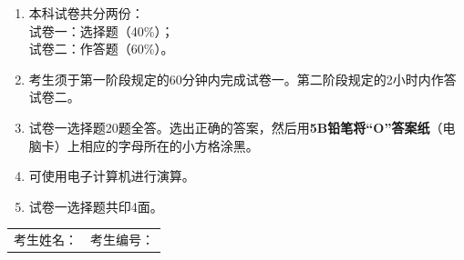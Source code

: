 \begin{enumerate}[label=\arabic*、,leftmargin=2em,itemsep=0.65em]
  \item 本科试卷共分两份：\\
  试卷一：选择题（40\%）；\\
  试卷二：作答题（60\%）。

  \item 考生须于第一阶段规定的60分钟内完成试卷一。第二阶段规定的2小时内作答试卷二。

  \item 试卷一选择题20题全答。选出正确的答案，然后用\textbf{5B铅笔将“O”答案纸}（电脑卡）上相应的字母所在的小方格涂黑。

  \item 可使用电子计算机进行演算。

  \item 试卷一选择题共印4面。
\end{enumerate}

\vspace{2.0em}

\begin{center}
  {\setlength{\fboxrule}{1.2pt}}
\end{center}

\vfill

\begin{tabular*}{\linewidth}{@{\extracolsep{\fill}}ll}
考生姓名：\underline{\hspace{4.2cm}} & 考生编号：\underline{\hspace{4.0cm}}
\end{tabular*}